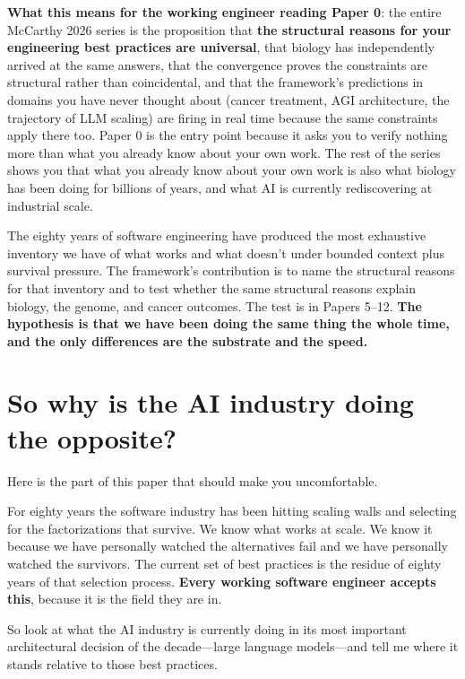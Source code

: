 \documentclass[11pt]{article}
\begin{document}
\textbf{What this means for the working engineer reading Paper 0}: the entire McCarthy 2026 series is the proposition that \textbf{the structural reasons for your engineering best practices are universal}, that biology has independently arrived at the same answers, that the convergence proves the constraints are structural rather than coincidental, and that the framework's predictions in domains you have never thought about (cancer treatment, AGI architecture, the trajectory of LLM scaling) are firing in real time because the same constraints apply there too. Paper 0 is the entry point because it asks you to verify nothing more than what you already know about your own work. The rest of the series shows you that what you already know about your own work is also what biology has been doing for billions of years, and what AI is currently rediscovering at industrial scale.

The eighty years of software engineering have produced the most exhaustive inventory we have of what works and what doesn't under bounded context plus survival pressure. The framework's contribution is to name the structural reasons for that inventory and to test whether the same structural reasons explain biology, the genome, and cancer outcomes. The test is in Papers 5--12. \textbf{The hypothesis is that we have been doing the same thing the whole time, and the only differences are the substrate and the speed.}

\section{So why is the AI industry doing the opposite?}
\label{sec:wtf}

Here is the part of this paper that should make you uncomfortable.

For eighty years the software industry has been hitting scaling walls and selecting for the factorizations that survive. We know what works at scale. We know it because we have personally watched the alternatives fail and we have personally watched the survivors. The current set of best practices is the residue of eighty years of that selection process. \textbf{Every working software engineer accepts this}, because it is the field they are in.

So look at what the AI industry is currently doing in its most important architectural decision of the decade---large language models---and tell me where it stands relative to those best practices.
\end{document}
